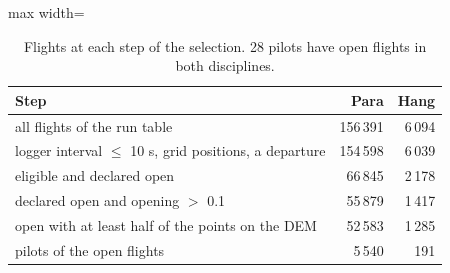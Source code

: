 \begin{table}
\centering
\small
\renewcommand{\arraystretch}{1.15}\setlength{\tabcolsep}{4pt}
\begin{adjustbox}{max width=\textwidth}
\begin{tabular}{lrr}
\toprule
Step & Para & Hang \\
\midrule
all flights of the run table & 156\,391 & 6\,094 \\
logger interval $\le$ 10 s, grid positions, a departure & 154\,598 & 6\,039 \\
eligible and declared open & 66\,845 & 2\,178 \\
declared open and opening $>$ 0.1 & 55\,879 & 1\,417 \\
open with at least half of the points on the DEM & 52\,583 & 1\,285 \\
pilots of the open flights & 5\,540 & 191 \\
\bottomrule
\end{tabular}
\end{adjustbox}
\caption{Flights at each step of the selection. 28 pilots have open flights in both disciplines.}\label{tab:funnel}
\end{table}
